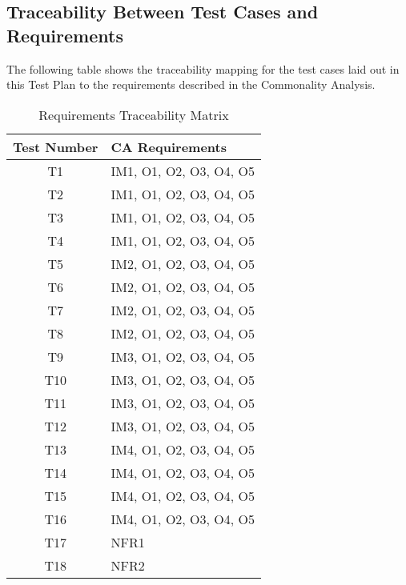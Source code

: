 \documentclass[12pt, titlepage]{article}
\begin{document}
%
%					
%					
%					
%					

%

\subsection{Traceability Between Test Cases and Requirements}
The following table shows the traceability mapping for the test cases laid out in this Test Plan to the requirements 
described in the Commonality Analysis.

\begin{table} [H]
  \caption{Requirements Traceability Matrix}
  \label{Table:Table_Traceability}  
\begin{tabular}{|c|p{8cm}|}
  \hline	
  \textbf{Test Number} & \textbf{CA Requirements}\\
  \hline 
   T1& IM1, O1, O2, O3, O4, O5\\ \hline
   T2& IM1, O1, O2, O3, O4, O5\\ \hline
   T3& IM1, O1, O2, O3, O4, O5\\ \hline
   T4& IM1, O1, O2, O3, O4, O5\\ \hline
   T5& IM2, O1, O2, O3, O4, O5\\ \hline
   T6& IM2, O1, O2, O3, O4, O5\\ \hline
   T7& IM2, O1, O2, O3, O4, O5\\ \hline
   T8& IM2, O1, O2, O3, O4, O5\\ \hline
   T9& IM3, O1, O2, O3, O4, O5\\ \hline
   T10& IM3, O1, O2, O3, O4, O5\\ \hline
   T11& IM3, O1, O2, O3, O4, O5\\ \hline
   T12& IM3, O1, O2, O3, O4, O5\\ \hline
   T13& IM4, O1, O2, O3, O4, O5\\ \hline
   T14& IM4, O1, O2, O3, O4, O5\\ \hline
   T15& IM4, O1, O2, O3, O4, O5\\ \hline
   T16& IM4, O1, O2, O3, O4, O5\\ \hline
   T17& NFR1\\ \hline
   T18& NFR2\\ \hline

\end{tabular}\\
\end{table}
				
\end{document}
